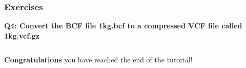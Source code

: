 \documentclass[11pt]{article}
\makeatletter
\newcommand{\boxspacing}{\kern\kvtcb@left@rule\kern\kvtcb@boxsep}
\newcommand{\prompt}[4]{
        {\ttfamily\llap{{\color{blue}\LARGE\faKeyboardO\hspace{3pt}#4}}\vspace{-\baselineskip}}
    }
\makeatother
\begin{document}
    \hypertarget{exercises}{%
\subsubsection{Exercises}\label{exercises}}

\textbf{Q4: Convert the BCF file 1kg.bcf to a compressed VCF file called
1kg.vcf.gz}

    \begin{tcolorbox}[breakable, size=fbox, boxrule=1pt, pad at break*=1mm,colback=cellbackground, colframe=cellborder]
\prompt{In}{incolor}{ }{\boxspacing}
\begin{Verbatim}[commandchars=\\\{\}]

\end{Verbatim}
\end{tcolorbox}

    \textbf{Congratulations} you have reached the end of the tutorial!


\end{document}
